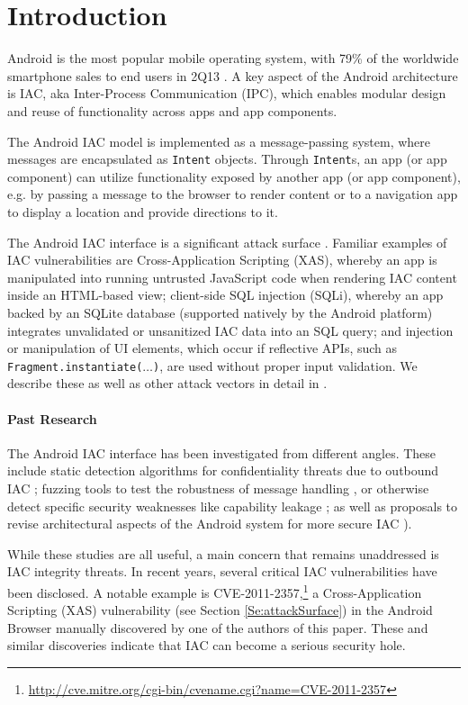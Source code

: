 \section{Introduction}\label{Se:introduction}

Android is the most popular mobile operating system, with 79\% of the worldwide smartphone sales to end users in 2Q13 \cite{gartner-android-share}. A key aspect of the Android architecture is IAC, aka Inter-Process Communication (IPC), which enables modular design and reuse of functionality across apps and app components.

The Android IAC model is implemented as a message-passing system, where messages are encapsulated as {\tt Intent} objects. Through {\tt Intent}s, an app (or app component) can utilize functionality exposed by another app (or app component), e.g. by passing a message to the browser to render content or to a navigation app to display a location and provide directions to it. 

The Android IAC interface is a significant attack surface \cite{CPGW:MOBISYS11,MAB:DSN12,EOM:SP09}. Familiar examples of IAC vulnerabilities are Cross-Application Scripting (XAS), whereby an app is manipulated into running untrusted JavaScript code when rendering IAC content inside an HTML-based view; client-side SQL injection (SQLi), whereby an app backed by an SQLite database (supported natively by the Android platform) integrates unvalidated or unsanitized IAC data into an SQL query; and injection or manipulation of UI elements, which occur if reflective APIs, such as {\tt Fragment.instantiate($\ldots$)}, are used without proper input validation. We describe these as well as other attack vectors in detail in . 

\paragraph{Past Research} The Android IAC interface has been investigated from different angles. These include static detection algorithms for confidentiality threats due to outbound IAC \cite{EOM:SP09}; fuzzing tools to test the robustness of message handling \cite{MAB:DSN12}, or otherwise detect specific security weaknesses like capability leakage \cite{YZWZD:ACCS14}; as well as proposals to revise architectural aspects of the Android system for more secure IAC \cite{KCHW:SPSM12}).

While these studies are all useful, a main concern that remains unaddressed is IAC integrity threats. In recent years, several critical IAC vulnerabilities have been disclosed. A notable example is CVE-2011-2357,\footnote{\url{http://cve.mitre.org/cgi-bin/cvename.cgi?name=CVE-2011-2357}} a Cross-Application Scripting (XAS) vulnerability
(see Section \ref{Se:attackSurface}) in the Android Browser manually discovered by one of the authors of this paper. These and similar discoveries indicate that IAC can become a serious security hole.

